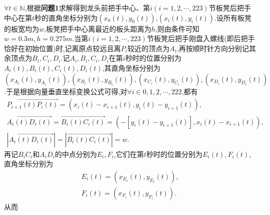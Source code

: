 \documentclass[lang=cn,newtx,10pt,scheme=chinese]{../Template/elegantbook}
\begin{document}
$\forall t\in \mathbb{N}$,根据\textbf{问题1}求解得到龙头前把手中心、第$i(i=1,2,\cdots,223)$节板凳后把手中心在第$t$秒的直角坐标分别为$(x_0(t),y_0(t))$,$(x_i(t),y_i(t))$.设所有板凳的板宽均为$w$,板凳把手中心离最近的板头距离为$h$,则由条件可知$w=0.3m,h=0.275m$.当第$i(i=1,2,\cdots,223)$节板凳后把手刚盘入螺线(即后把手恰好在初始位置)时,记离原点较远且离$P_i$较近的顶点为$A_i$,再按顺时针方向分别记其余顶点为$B_i,C_i,D_i$.记$A_i,B_i,C_i,D_i$在第$i$秒时的位置分别为$A_i(t),B_i(t),C_i(t),D_i(t)$,其直角坐标分别为$(x_{A_i}(t),y_{A_i}(t)),(x_{B_i}(t),y_{B_i}(t)),(x_{C_i}(t),y_{C_i}(t)),(x_{D_i}(t),y_{D_i}(t))$.于是根据向量垂直坐标变换公式可得,对$\forall i\in {0,1,2,\cdots,222}$,都有
\begin{gather}
\overrightarrow{P_{i+1}\left( t \right) P_i\left( t \right) }=\left( x_i\left( t \right) -x_{i+1}\left( t \right) ,y_i\left( t \right) -y_{i+1}\left( t \right) \right) ,\label{problem-2.1}
\\
\overrightarrow{A_i\left( t \right) D_i\left( t \right) }=\overrightarrow{B_i\left( t \right) C_i\left( t \right) }=\left( -\left[ y_i\left( t \right) -y_{i+1}\left( t \right) \right] ,x_i\left( t \right) -x_{i+1}\left( t \right) \right) ,\label{problem-2.2}
\\
\left| \overrightarrow{A_i\left( t \right) D_i\left( t \right) } \right|=\left| \overrightarrow{B_i\left( t \right) C_i\left( t \right) } \right|=w.\label{problem-2.3}
\end{gather}
再记$B_iC_i$和$A_iD_i$的中点分别为$E_i,F_i$,它们在第$t$秒时的位置分别为$E_i(t),F_i(t)$,直角坐标分别为
\begin{align}
E_i(t)=(x_{E_i}(t),y_{E_i}(t)),
\\
F_i(t)=(x_{F_i}(t),y_{F_i}(t)).
\end{align}
从而
\end{document}
